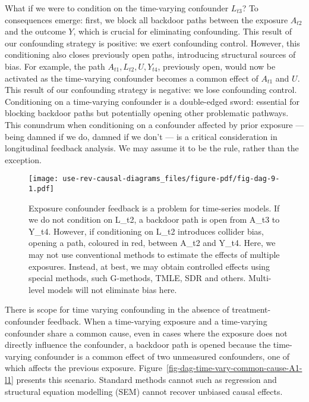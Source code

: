 \documentclass[
  singlecolumn,
  9pt]{article}
\begin{document}
What if we were to condition on the time-varying confounder \(L_{t3}\)?
To consequences emerge: first, we block all backdoor paths between the
exposure \(A_{t2}\) and the outcome \(Y\), which is crucial for
eliminating confounding. This result of our confounding strategy is
positive: we exert confounding control. However, this conditioning also
closes previously open paths, introducing structural sources of bias.
For example, the path \(A_{t1}, L_{t2}, U, Y_{t4}\), previously open,
would now be activated as the time-varying confounder becomes a common
effect of \(A_{t1}\) and \(U\). This result of our confounding strategy
is negative: we lose confounding control. Conditioning on a time-varying
confounder is a double-edged sword: essential for blocking backdoor
paths but potentially opening other problematic pathways. This conundrum
when conditioning on a confounder affected by prior exposure ---being
damned if we do, damned if we don't --- is a critical consideration in
longitudinal feedback analysis. We may assume it to be the rule, rather
than the exception.

\begin{figure}

{\centering \texttt{[image: use-rev-causal-diagrams\_files/figure-pdf/fig-dag-9-1.pdf]}

}

\caption{\label{fig-dag-9}Exposure confounder feedback is a problem for
time-series models. If we do not condition on L\_t2, a backdoor path is
open from A\_t3 to Y\_t4. However, if conditioning on L\_t2 introduces
collider bias, opening a path, coloured in red, between A\_t2 and Y\_t4.
Here, we may not use conventional methods to estimate the effects of
multiple exposures. Instead, at best, we may obtain controlled effects
using special methods, such G-methods, TMLE, SDR and others. Multi-level
models will not eliminate bias here.}

\end{figure}

There is scope for time varying confounding in the absence of
treatment-confounder feedback. When a time-varying exposure and a
time-varying confounder share a common cause, even in cases where the
exposure does not directly influence the confounder, a backdoor path is
opened because the time-varying confounder is a common effect of two
unmeasured confounders, one of which affects the previous exposure.
Figure~\ref{fig-dag-time-vary-common-cause-A1-l1} presents this
scenario. Standard methods cannot such as regression and structural
equation modelling (SEM) cannot recover unbiased causal effects.
\end{document}
